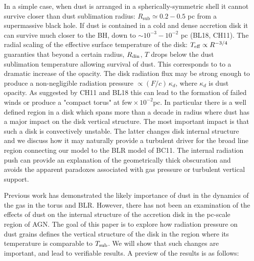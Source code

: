 \documentclass[12pt,english,preprint]{aastex}
\newcommand{\mybf}{\bf}
\newcommand{\su}[2]{#1_{\rm #2}}
\newcommand{\Tsub}{ \su{T}{sub} }
\begin{document}
In  a simple case, when dust is arranged in a spherically-symmetric
shell it cannot survive closer than dust sublimation radius: $R_{\text{sub}}\simeq0.2-0.5$
pc from a supermassive black hole.
If dust is contained in a cold and dense accretion disk it can survive
much closer to the BH, down to $\sim10^{-3}-10^{-2}$ pc (BL18, CH11). The radial
scaling of the effective surface temperature of the disk: $T_{{\rm eff}}\propto R^{-3/4}$
guaranties that beyond a certain radius, $R_{{\rm din}}$, $T$ drops
below the dust sublimation temperature
allowing survival of dust. This corresponds to 
to a dramatic increase of the opacity. The disk
radiation flux
may be strong enough to produce a non-negligible radiation pressure
$\propto(F/c)\,\kappa_{d}$, where $\kappa_{d}$ is dust opacity.
As  suggested by CH11 and  BL18 this can lead to the formation of failed
winds or produce a "compact torus" at $\text{few}\times10^{-2}$pc.
In particular
there is a well defined region in a disk which spans
more than a decade in radius where dust has a major impact on the disk vertical
structure. The most important  impact is that such a disk is convectively
unstable. The latter changes disk internal structure and we discuss
how it may naturally provide a turbulent driver for the broad line
region connecting our model to the BLR model of BC11. 
The internal radiation push 
can provide an explanation of the geometrically
thick obscuration and avoids the  apparent paradoxes associated with 
gas pressure or turbulent vertical 
support.

Previous work has demonstrated the likely importance of dust in the dynamics of the gas in the 
torus and BLR.  However, there has not been an examination of the effects of dust on the internal structure of 
the accretion disk in the pc-scale region of AGN. 
The goal of this paper is to explore how radiation pressure on dust grains defines 
the vertical structure of the disk in the region where its temperature is comparable to $\Tsub$. 
We will show that such changes are important, and lead to verifiable
results. A preview of the results is as follows:
\end{document}
